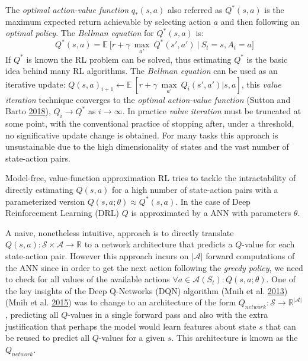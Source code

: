 \documentclass[
  12pt,
  openany]{book}
\begin{document}
The \emph{optimal action-value function} \(q_*(s,a)\) also referred as \(Q^*(s,a)\) is the maximum expected return achievable by selecting action \(a\) and then following an \emph{optimal policy}. The \emph{Bellman equation} for \(Q^*(s,a)\) is:
\[Q^*(s,a) = \mathds{E}\ \bigg[ r + \gamma\ \underset{a'}{\max}\ Q^*(s',a')\ \bigg|\ S_t=s, A_t=a \bigg]\]
If \(Q^*\) is known the RL problem can be solved, thus estimating \(Q^*\) is the basic idea behind many RL algorithms. The \emph{Bellman equation} can be used as an iterative update: \(Q(s,a)_{i+1} \leftarrow \mathds{E}\ [ r + \gamma\ \underset{a'}{\max}\ Q_i(s',a')| s, a ]\), this \emph{value iteration} technique converges to the \emph{optimal action-value function} (Sutton and Barto \protect\hyperlink{ref-sutton2018reinforcement}{2018}), \(Q_i \rightarrow Q^*\) as \(i \rightarrow \infty\). In practice \emph{value iteration} must be truncated at some point, with the conventional practice of stopping after, under a threshold, no significative update change is obtained. For many tasks this approach is unsustainable due to the high dimensionality of states and the vast number of state-action pairs.

Model-free, value-function approximation RL tries to tackle the intractability of directly estimating \(Q(s,a)\) for a high number of state-action pairs with a parameterized version \(Q(s,a;\theta) \approx Q^*(s,a)\). In the case of Deep Reinforcement Learning (DRL) \(Q\) is approximated by a ANN with parameters \(\theta\).

A naive, nonetheless intuitive, approach is to directly translate \(Q(s,a): \mathcal{S} \times \mathcal{A} \to \mathds{R}\) to a network architecture that predicts a \(Q\)-value for each state-action pair. However this approach incurs on \(|\mathcal{A}|\) forward computations of the ANN since in order to get the next action following the \emph{greedy policy}, we need to check for all values of the available actions \(\forall a \in \mathcal{A}(S_t): Q(s,a;\theta)\). One of the key insights of the Deep Q-Networks (DQN) algorithm (Mnih et al. \protect\hyperlink{ref-mnih2013playing}{2013})(Mnih et al. \protect\hyperlink{ref-mnih2015human}{2015}) was to change to an architecture of the form \(Q_{network}: \mathcal{S} \to \mathds{R}^{|\mathcal{A}|}\), predicting all \(Q\)-values in a single forward pass and also with the extra justification that perhaps the model would learn features about state \(s\) that can be reused to predict all \(Q\)-values for a given \(s\). This architecture is known as the \(Q_{network}\).
\end{document}
